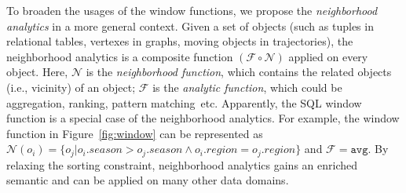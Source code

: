 To broaden the usages of the window functions, we propose the \emph{neighborhood
analytics} in a more general context. Given a set of objects 
(such as tuples in relational tables, vertexes in graphs, moving objects in trajectories),
the neighborhood analytics is a composite function
$(\mathcal{F} \circ \mathcal{N})$ applied on every object. Here, $\mathcal{N}$
is the \emph{neighborhood function}, which contains the related objects (i.e., vicinity) of an object;
$\mathcal{F}$ is the \emph{analytic function}, which could be aggregation, ranking,
pattern matching~etc.
Apparently, the SQL window function is a special case of the
neighborhood analytics. For example, the window function in Figure~\ref{fig:window} 
can be represented as $\mathcal{N}(o_i)=\{o_j | o_i.season > o_j.season \wedge o_i.region = o_j.region\}$
and $\mathcal{F} = \mathtt{avg}$.
By relaxing the sorting constraint, neighborhood analytics gains an enriched 
semantic and can be applied on many other data domains.

